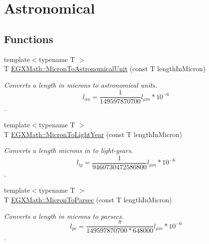 \hypertarget{group___e_g_x_math-_conversions-_length_conversions-_non-_s_i-_micron-_astronomical}{}\section{Astronomical}
\label{group___e_g_x_math-_conversions-_length_conversions-_non-_s_i-_micron-_astronomical}
\subsection*{Functions}
\begin{DoxyCompactItemize}
\item 
{\footnotesize template$<$typename T $>$ }\\T \mbox{\hyperlink{group___e_g_x_math-_conversions-_length_conversions-_non-_s_i-_micron-_astronomical_ga2d3ebedddec3a5a3a84405f466a6b6d6}{E\+G\+X\+Math\+::\+Micron\+To\+Astronomical\+Unit}} (const T length\+In\+Micron)
\begin{DoxyCompactList}\small\item\em Converts a length in microns to astronomical units. \[ l_{au}= \frac{1}{149597870700} l_{\mu m} * 10^{-6} \]. \end{DoxyCompactList}\item 
{\footnotesize template$<$typename T $>$ }\\T \mbox{\hyperlink{group___e_g_x_math-_conversions-_length_conversions-_non-_s_i-_micron-_astronomical_ga34ef31b495ba7e34c7b92f43e0cd41a6}{E\+G\+X\+Math\+::\+Micron\+To\+Light\+Year}} (const T length\+In\+Micron)
\begin{DoxyCompactList}\small\item\em Converts a length microns in to light-\/years. \[ l_{ly}= \frac{1}{9460730472580800} l_{\mu m} * 10^{-6} \]. \end{DoxyCompactList}\item 
{\footnotesize template$<$typename T $>$ }\\T \mbox{\hyperlink{group___e_g_x_math-_conversions-_length_conversions-_non-_s_i-_micron-_astronomical_gae4a055a8e8b4856c9ac65fb7b2b7a724}{E\+G\+X\+Math\+::\+Micron\+To\+Parsec}} (const T length\+In\+Micron)
\begin{DoxyCompactList}\small\item\em Converts a length in microns to parsecs. \[ l_{pc}=\frac{\pi}{149597870700 * 648000} l_{\mu m} * 10^{-6} \]. \end{DoxyCompactList}\end{DoxyCompactItemize}


